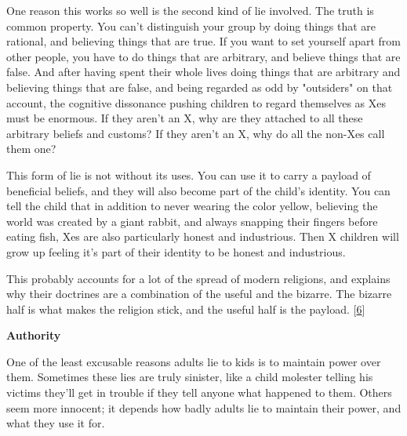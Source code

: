 One reason this
                  works so well is the second kind of lie involved. The truth is
                  common property. You can't distinguish your group by doing
                  things that are rational, and believing things that are true.
                  If you want to set yourself apart from other people, you have
                  to do things that are arbitrary, and believe things that are
                  false. And after having spent their whole lives doing things
                  that are arbitrary and believing things that are false, and
                  being regarded as odd by "outsiders" on that account, the
                  cognitive dissonance pushing children to regard themselves as
                  Xes must be enormous. If they aren't an X, why are they
                  attached to all these arbitrary beliefs and customs? If they
                  aren't an X, why do all the non-Xes call them one?

This
                  form of lie is not without its uses. You can use it to carry a
                  payload of beneficial beliefs, and they will also become part
                  of the child's identity. You can tell the child that in
                  addition to never wearing the color yellow, believing the
                  world was created by a giant rabbit, and always snapping their
                  fingers before eating fish, Xes are also particularly honest
                  and industrious. Then X children will grow up feeling it's
                  part of their identity to be honest and industrious.

This
                  probably accounts for a lot of the spread of modern religions,
                  and explains why their doctrines are a combination of the
                  useful and the bizarre. The bizarre half is what makes the
                  religion stick, and the useful half is the payload.
                  [\href{\#f6n}{6}]


                  \textbf{Authority}

One of the least excusable reasons
                  adults lie to kids is to maintain power over them. Sometimes
                  these lies are truly sinister, like a child molester telling
                  his victims they'll get in trouble if they tell anyone what
                  happened to them. Others seem more innocent; it depends how
                  badly adults lie to maintain their power, and what they use it
                  for.

